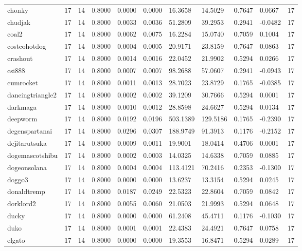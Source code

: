 \begin{table}[htbp]
\begin{tabular}{lllllllllll}
chonky & 17 & 14 & 0.8000 & 0.0000 & 0.0000 & 16.3658 & 14.5029 & 0.7647 & 0.0667 & 17 \\
chudjak & 17 & 14 & 0.8000 & 0.0033 & 0.0036 & 51.2809 & 39.2953 & 0.2941 & -0.0482 & 17 \\
coal2 & 17 & 14 & 0.8000 & 0.0062 & 0.0075 & 16.2284 & 15.0740 & 0.7059 & 0.1004 & 17 \\
costcohotdog & 17 & 14 & 0.8000 & 0.0004 & 0.0005 & 20.9171 & 23.8159 & 0.7647 & 0.0863 & 17 \\
crashout & 17 & 14 & 0.8000 & 0.0014 & 0.0016 & 22.0452 & 21.9902 & 0.5294 & 0.0266 & 17 \\
csi888 & 17 & 14 & 0.8000 & 0.0007 & 0.0007 & 98.2688 & 57.0607 & 0.2941 & -0.0943 & 17 \\
cumrocket & 17 & 14 & 0.8000 & 0.0011 & 0.0013 & 28.7023 & 23.8729 & 0.1765 & -0.0385 & 17 \\
dancingtriangle2 & 17 & 14 & 0.8000 & 0.0002 & 0.0002 & 39.1209 & 30.7666 & 0.5294 & 0.0001 & 17 \\
darkmaga & 17 & 14 & 0.8000 & 0.0010 & 0.0012 & 28.8598 & 24.6627 & 0.5294 & 0.0134 & 17 \\
deepworm & 17 & 14 & 0.8000 & 0.0192 & 0.0196 & 503.1389 & 129.5186 & 0.1765 & -0.2390 & 17 \\
degenspartanai & 17 & 14 & 0.8000 & 0.0296 & 0.0307 & 188.9749 & 91.3913 & 0.1176 & -0.2152 & 17 \\
dejitarutsuka & 17 & 14 & 0.8000 & 0.0009 & 0.0011 & 19.9001 & 18.0414 & 0.4706 & 0.0001 & 17 \\
dogemascotshibu & 17 & 14 & 0.8000 & 0.0002 & 0.0003 & 14.0325 & 14.6338 & 0.7059 & 0.0885 & 17 \\
dogeonsolana & 17 & 14 & 0.8000 & 0.0004 & 0.0004 & 113.4121 & 70.2416 & 0.2353 & -0.1300 & 17 \\
doggo3 & 17 & 14 & 0.8000 & 0.0000 & 0.0000 & 13.6237 & 13.3154 & 0.5294 & 0.0245 & 17 \\
donaldtremp & 17 & 14 & 0.8000 & 0.0187 & 0.0249 & 22.5323 & 22.8604 & 0.7059 & 0.0842 & 17 \\
dorklord2 & 17 & 14 & 0.8000 & 0.0055 & 0.0060 & 21.0503 & 21.9993 & 0.5294 & 0.0648 & 17 \\
ducky & 17 & 14 & 0.8000 & 0.0000 & 0.0000 & 61.2408 & 45.4711 & 0.1176 & -0.1030 & 17 \\
duko & 17 & 14 & 0.8000 & 0.0001 & 0.0001 & 22.4383 & 24.4921 & 0.7647 & 0.0758 & 17 \\
elgato & 17 & 14 & 0.8000 & 0.0000 & 0.0000 & 19.3553 & 16.8471 & 0.5294 & 0.0289 & 17 \\

\end{tabular}
\end{table}
